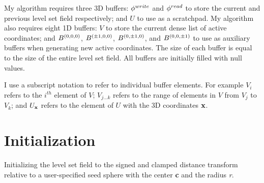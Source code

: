 My algorithm requires three 3D buffers: $\phi^{write}$ and $\phi^{read}$ to store the current and previous level set field respectively; and $U$ to use as a scratchpad. My algorithm also requires eight 1D buffers: $V$ to store the current dense list of active coordinates; and $B^{ \left( 0,0,0 \right) }$, $B^{ \left( \pm 1,0,0 \right) }$, $B^{ \left( 0, \pm 1,0 \right) }$, and $B^{ \left( 0,0, \pm 1 \right) }$ to use as auxiliary buffers when generating new active coordinates. The size of each buffer is equal to the size of the entire level set field. All buffers are initially filled with null values.

I use a subscript notation to refer to individual buffer elements. For example $V_i$ refers to the $i^{th}$ element of $V$; $V_{j \ldots k }$ refers to the range of elements in $V$ from $V_j$ to $V_k$; and $U_{{\mathbf x}}$ refers to the element of $U$ with the 3D coordinates ${\mathbf x}$.


\section{Initialization}
\label{subsec:initialization}


\begin{Listing}[t]
    \caption{Initializing the level set field to the signed and clamped distance transform relative to a user-specified seed sphere with the center \textbf{c} and the radius \textit{r}. \label{pseudo:1} }
    \begin{algorithmic}[1]
        \ENDFOR
    \end{algorithmic}
\end{Listing}


